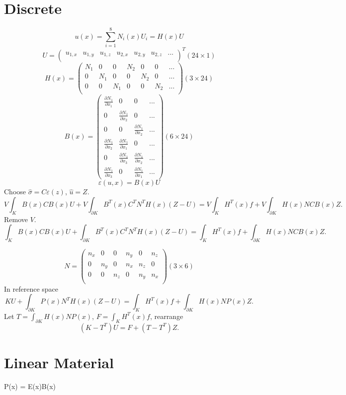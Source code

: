 \documentclass{article}
\begin{document}
\section{Discrete}
	\[u(x)=\sum_{i=1}^{8}N_i(x)U_i = H(x)U\]
	\[U = \begin{pmatrix}
	u_{1,x} & u_{1,y} & u_{1,z} & u_{2,x} & u_{2,y} & u_{2,z} & ...\\
	\end{pmatrix}^T(24\times 1)\]
	\[H(x) = \begin{pmatrix}
	  N_1 & 0   & 0   & N_2 & 0   & 0   & ...\\
	  0   & N_1 & 0   & 0   & N_2 & 0   & ...\\
	  0   & 0   & N_1 & 0   & 0   & N_2 & ...\\	  	  
	\end{pmatrix}(3\times 24)\]
	\[B(x) = \begin{pmatrix}
	  \frac{\partial N_1}{\partial x_1} & 0 & 0& ...\\
	  0 & \frac{\partial N_1}{\partial x_2} & 0& ...\\
	  0 & 0 & \frac{\partial N_1}{\partial x_2}& ...\\
 	  \frac{\partial N_1}{\partial x_2} & \frac{\partial N_1}{\partial x_1} & 0& ...\\
  	  0 & \frac{\partial N_1}{\partial x_3} & \frac{\partial N_1}{\partial x_2}& ...\\
  	  \frac{\partial N_1}{\partial x_3} & 0 & \frac{\partial N_1}{\partial x_1}& ...
	\end{pmatrix}(6\times 24)\]
	\[\varepsilon(u,x) = B(x)U\]
	Choose $\hat{\sigma}=C\varepsilon(z)$, $\hat{u}=Z$.
	\[V\int_K B(x)CB(x)U + V\int_{\partial K}B^T(x)C^TN^TH(x)(Z-U)
	=V\int_K H^T(x)f+V\int_{\partial K}H(x)NCB(x)Z.\]
	Remove $V$.
	\[\int_K B(x)CB(x)U + \int_{\partial K}B^T(x)C^TN^TH(x)(Z-U)
	=\int_K H^T(x)f + \int_{\partial K}H(x)NCB(x)Z.\]
	
	\[
	N = \begin{pmatrix}
	n_x & 0   & 0   & n_y & 0   & n_z\\
	0   & n_y & 0   & n_x & n_z & 0 \\
	0   & 0   & n_z & 0   & n_y & n_x  \\		
	\end{pmatrix}(3\times 6)
	\]
	In reference space
	\[KU + \int_{\partial K}P(x)N^TH(x)(Z-U)
	=\int_K H^T(x)f + \int_{\partial K}H(x)NP(x)Z.\]
	Let $T=\int_{\partial K}H(x)NP(x)$, $F = \int_K H^T(x)f$, rearrange
	\[(K-T^T)U=F + (T-T^T)Z.\]
	
\section{Linear Material}
	P(x) = E(x)B(x)
\end{document}
